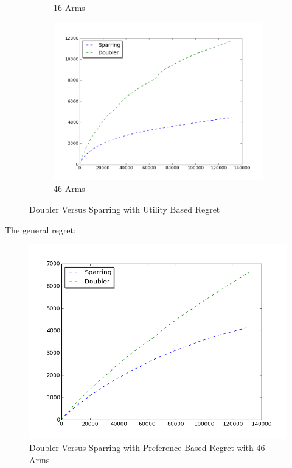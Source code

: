 \documentclass{llncs}
\begin{document}
\begin{figure}[h!]
\begin{subfigure}{.5\textwidth}
  \caption{16 Arms}
  \label{fig:sub2}
\end{subfigure}
\begin{subfigure}{.5\textwidth}
  \centering
  \includegraphics[scale=0.3, natwidth=410,natheight=442]{figures/doubler_sparring_MQ2007_46arms.png}
  \caption{46 Arms}
  \label{fig:sub2}
\end{subfigure}
\caption{Doubler Versus Sparring with Utility Based Regret}
\label{fig:test}
\end{figure}

The general regret:
\begin{figure}[h!]
  \centering
     \includegraphics[scale=0.2, natwidth=410,natheight=442]{figures/doubler_sparring_MQ2007_general.png} 
  \caption{Doubler Versus Sparring with Preference Based Regret with 46 Arms}
\end{figure}
\end{document}
